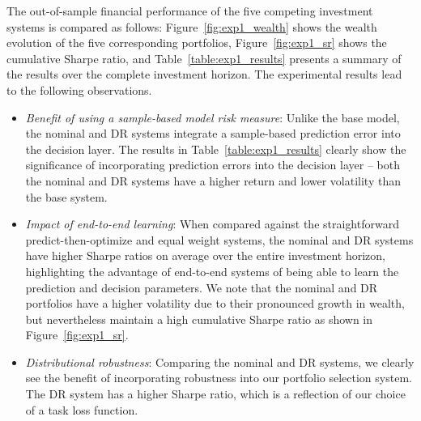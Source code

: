 \documentclass[10pt, twocolumn]{article}
\theoremstyle{plain}
\theoremstyle{definition}
\begin{document}
The out-of-sample financial performance of the five competing investment 
systems is compared as follows:
Figure~\ref{fig:exp1_wealth} shows the 
wealth evolution of the five corresponding portfolios, Figure~\ref{fig:exp1_sr} 
shows the cumulative Sharpe ratio, and 
Table~\ref{table:exp1_results} presents 
a summary of the results over the complete investment horizon. The experimental 
results lead to the following observations. 

\begin{itemize}[itemsep=-0.15em, topsep=0pt, leftmargin=*]
  
\item \emph{Benefit of using a sample-based model risk measure}: Unlike the base 
  model, the nominal and DR systems integrate a sample-based prediction error 
  into the decision layer. The results in Table~\ref{table:exp1_results} clearly 
  show the significance of incorporating prediction errors into the decision 
  layer -- both the nominal and DR systems have a higher return and lower 
  volatility than the base system.
  
\item \emph{Impact of end-to-end learning}: When compared against the 
  straightforward predict-then-optimize and equal weight systems, the nominal 
  and DR systems have higher Sharpe ratios on average over the entire
  investment horizon, highlighting the advantage of end-to-end systems of 
  being able to learn the prediction and decision parameters. We note that the nominal and 
  DR portfolios have a higher volatility due to their pronounced growth in 
  wealth, but nevertheless maintain a high cumulative Sharpe ratio as 
  shown in Figure~\ref{fig:exp1_sr}.
  
\item \emph{Distributional robustness}: Comparing the nominal and DR 
  systems, we clearly see the benefit of incorporating robustness into our 
  portfolio selection system. The DR system has a higher Sharpe ratio, which is 
  a reflection of our choice of a task loss function. 
  
\end{itemize}
\end{document}
